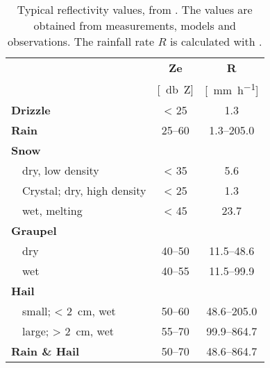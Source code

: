 \begin{table}[h]
	\begin{center}
		\caption{Typical reflectivity values, from \cite{doviak_doppler_1993}. The values are obtained from measurements, models and observations. The rainfall rate $R$ is calculated with . }\label{tab:ref_values}
		\begin{tabular}{ll|c|c}
			\hline \hline
			\multicolumn{2}{l|}{} & \textbf{Ze} & \textbf{R} \\ 
			\multicolumn{2}{l|}{} & [\SI{}{\decibel Z}] & [\SI{}{\mm\per\hour}] \\ \hline \hline
			\multicolumn{2}{l|}{\textbf{Drizzle}} & \num{< 25} &  \num{1.3} \\ \hline
			\multicolumn{2}{l|}{\textbf{Rain}} & \numrange{25}{60} & \numrange{1.3}{205.0} \\ \hline
			\multicolumn{2}{l|}{\textbf{Snow}} &  \\ 
			& dry, low density 	& \num{< 35} & \num{5.6}\\ \hline
			& Crystal; dry, high density & \num{< 25} & \num{1.3}\\ \hline
			& wet, melting 		& \num{< 45} & \num{23.7} \\ \hline
			\multicolumn{2}{l|}{\textbf{Graupel}} & \\
			& dry 				& \numrange{40}{50} & \numrange{11.5}{48.6} \\ \hline
			& wet				& \numrange{40}{55} & \numrange{11.5}{99.9} \\ \hline
			\multicolumn{2}{l|}{\textbf{Hail}} & \\
			& small; \SI{< 2}{\cm}, wet & \numrange{50}{60} & \numrange{48.6}{205.0}\\
			& large; \SI{> 2}{\cm}, wet & \numrange{55}{70} & \numrange{99.9}{864.7}\\ \hline
			\multicolumn{2}{l|}{\textbf{Rain \& Hail}} & \numrange{50}{70} & \numrange{48.6}{864.7} \\ 
			\hline \hline
		\end{tabular}
	\end{center}
\end{table}